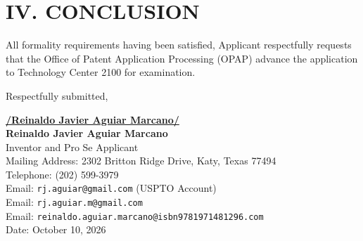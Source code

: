 \documentclass[11pt,letterpaper]{article}
\begin{document}
\section*{IV. CONCLUSION}

All formality requirements having been satisfied, Applicant respectfully requests that the Office of Patent Application Processing (OPAP) advance the application to Technology Center 2100 for examination.

\vspace{0.6cm}
\begin{singlespace}
\noindent Respectfully submitted, \par\vspace{0.8cm}
\underline{\textbf{/Reinaldo Javier Aguiar Marcano/}} \\
\textbf{Reinaldo Javier Aguiar Marcano} \\
Inventor and Pro Se Applicant \\
Mailing Address: 2302 Britton Ridge Drive, Katy, Texas 77494 \\
Telephone: (202) 599-3979 \\
Email: \texttt{rj.aguiar@gmail.com} (USPTO Account) \\
Email: \texttt{rj.aguiar.m@gmail.com} \\
Email: \texttt{reinaldo.aguiar.marcano@isbn9781971481296.com} \\
Date: October 10, 2026
\end{singlespace}
\end{document}
